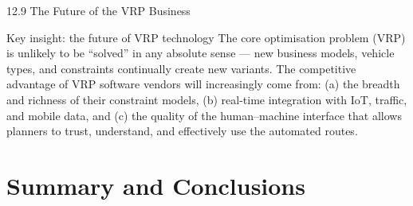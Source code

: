 \documentclass[aspectratio=169,10pt]{beamer}
\begin{document}
\begin{frame}[allowframebreaks]{12.9 \; The Future of the VRP Business}
  \begin{alertblock}{Key insight: the future of VRP technology}
    The core optimisation problem (VRP) is unlikely to be ``solved'' in
    any absolute sense --- new business models, vehicle types, and
    constraints continually create new variants.
    The competitive advantage of VRP software vendors will increasingly
    come from: (a) the breadth and richness of their constraint models,
    (b) real-time integration with IoT, traffic, and mobile data, and
    (c) the quality of the human--machine interface that allows planners
    to trust, understand, and effectively use the automated routes.
  \end{alertblock}
\end{frame}

\section{Summary and Conclusions}
\end{document}
